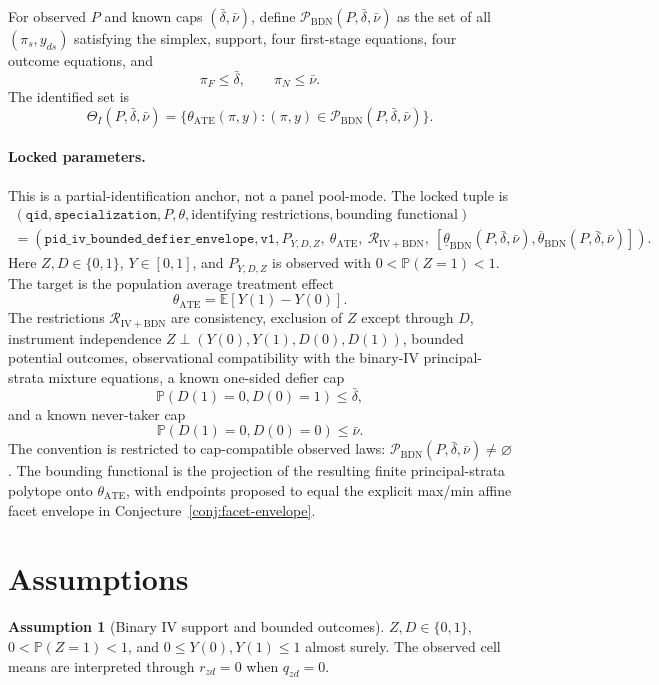 \documentclass[11pt]{article}
\newcommand{\E}{\mathbb{E}}
\renewcommand{\Pr}{\mathbb{P}}
\newcommand{\calR}{\mathcal{R}}
\theoremstyle{definition}
\newtheorem{assumption}{Assumption}
\theoremstyle{plain}
\theoremstyle{remark}
\begin{document}
For observed \(P\) and known caps \((\bar\delta,\bar\nu)\), define
\(\mathcal{P}_{\mathrm{BDN}}(P,\bar\delta,\bar\nu)\) as the set of all
\((\pi_s,y_{ds})\) satisfying the simplex, support, four first-stage
equations, four outcome equations, and
\[
\pi_F\le\bar\delta,\qquad \pi_N\le\bar\nu .
\]
The identified set is
\[
\Theta_I(P,\bar\delta,\bar\nu)=
\{\theta_{\mathrm{ATE}}(\pi,y):
(\pi,y)\in\mathcal{P}_{\mathrm{BDN}}(P,\bar\delta,\bar\nu)\}.
\]

\paragraph{Locked parameters.}
This is a partial-identification anchor, not a panel pool-mode.  The locked tuple is
\[
\begin{gathered}
(\texttt{qid},\texttt{specialization},P,\theta,\text{identifying restrictions},
  \text{bounding functional})\\
=
(\texttt{pid\_iv\_bounded\_defier\_envelope},\texttt{v1},
  P_{Y,D,Z},\ \theta_{\mathrm{ATE}},\
  \calR_{\mathrm{IV+BDN}},\
  [\underline\theta_{\mathrm{BDN}}(P,\bar\delta,\bar\nu),
    \overline\theta_{\mathrm{BDN}}(P,\bar\delta,\bar\nu)]) .
\end{gathered}
\]
Here \(Z,D\in\{0,1\}\), \(Y\in[0,1]\), and \(P_{Y,D,Z}\) is observed with
\(0<\Pr(Z=1)<1\).  The target is the population average treatment effect
\[
\theta_{\mathrm{ATE}}=\E[Y(1)-Y(0)].
\]
The restrictions \(\calR_{\mathrm{IV+BDN}}\) are consistency, exclusion of \(Z\)
except through \(D\), instrument independence
\(Z\perp (Y(0),Y(1),D(0),D(1))\), bounded potential outcomes, observational
compatibility with the binary-IV principal-strata mixture equations, a known
one-sided defier cap
\[
\Pr(D(1)=0,D(0)=1)\le \bar\delta,
\]
and a known never-taker cap
\[
\Pr(D(1)=0,D(0)=0)\le \bar\nu.
\]
The convention is restricted to cap-compatible observed laws:
\(\mathcal{P}_{\mathrm{BDN}}(P,\bar\delta,\bar\nu)\ne\varnothing\).
The bounding functional is the projection of the resulting finite
principal-strata polytope onto \(\theta_{\mathrm{ATE}}\), with endpoints proposed
to equal the explicit max/min affine facet envelope in
Conjecture~\ref{conj:facet-envelope}.

\section{Assumptions}
\begin{assumption}[Binary IV support and bounded outcomes]\label{ass:support}
\(Z,D\in\{0,1\}\), \(0<\Pr(Z=1)<1\), and
\(0\le Y(0),Y(1)\le1\) almost surely.  The observed cell means are interpreted
through \(r_{zd}=0\) when \(q_{zd}=0\).
\end{assumption}
\end{document}
